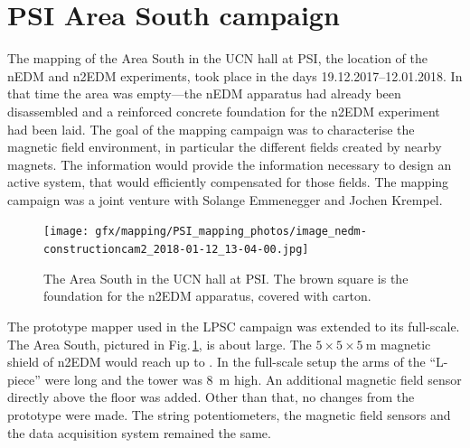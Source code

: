 \section{PSI Area South campaign}
The mapping of the Area South in the UCN hall at PSI, the location of the nEDM and n2EDM experiments, took place in the days 19.12.2017--12.01.2018. In that time the area was empty---the nEDM apparatus had already been disassembled and a reinforced concrete foundation for the n2EDM experiment had been laid.
The goal of the mapping campaign was to characterise the magnetic field environment, in particular the different fields created by nearby magnets.
The information would provide the information necessary to design an active system, that would efficiently compensated for those fields.
The mapping campaign was a joint venture with Solange Emmenegger and Jochen Krempel.

\begin{figure}
  \centering
  \texttt{[image: gfx/mapping/PSI\_mapping\_photos/image\_nedm-constructioncam2\_2018-01-12\_13-04-00.jpg]}
  \caption{The Area South in the UCN hall at PSI\@. The brown square is the foundation for the n2EDM apparatus, covered with carton. }\label{fig:mapping_photo}
\end{figure}

The prototype mapper used in the LPSC campaign was extended to its full-scale. The Area South, pictured in Fig.\,\ref{fig:mapping_photo}, is about  large.
The $5 \times 5 \times \SI{5}{\metre}$ magnetic shield of n2EDM would reach up to . In the full-scale setup the arms of the ``L-piece'' were  long and the tower was \SI{8}{\metre} high.
An additional magnetic field sensor directly above the floor was added. Other than that, no changes from the prototype were made. The string potentiometers, the magnetic field sensors and the data acquisition system remained the same.


